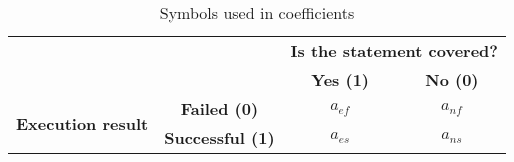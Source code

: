 \begin{table}
\centering
\begin{tabular}{|c|c|c|c|}
\hline
\multicolumn{2}{|c|}{} & \multicolumn{2}{c|}{\textbf{Is the statement covered?}}\\
\cline{3-4}
\multicolumn{2}{|c|}{} & \textbf{Yes (1)} & \textbf{No (0)}  \\ \hline
\multirow{2}{*}{\textbf{Execution result}} & \textbf{Failed (0)} &$a_{ef}$ & $a_{nf}$\\
 & \textbf{Successful (1)} & $a_{es}$ & $a_{ns}$\\ \hline
\end{tabular}
\caption{Symbols used in coefficients}
\label{tab: Sus symbols}
\end{table}
